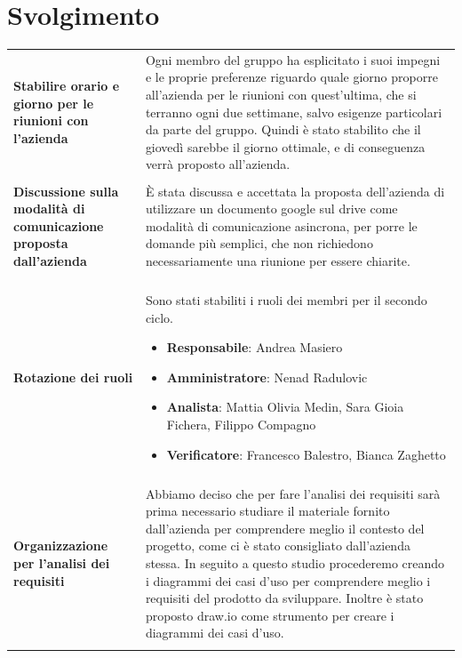 \documentclass[a4paper,12pt]{article}
\begin{document}
    \section{Svolgimento} {
        \begin{longtable}{P{5cm}|P{10cm}} 
            \textbf{Stabilire orario e giorno per le riunioni con l'azienda} & Ogni membro del gruppo ha esplicitato i suoi impegni e le proprie preferenze riguardo quale giorno proporre all'azienda per le riunioni con quest'ultima, che si terranno ogni due settimane, salvo esigenze particolari da parte del gruppo. Quindi è stato stabilito che il giovedì sarebbe il giorno ottimale, e di conseguenza verrà proposto all'azienda. \\\\
            \textbf{Discussione sulla modalità di comunicazione proposta dall'azienda} & È stata discussa e accettata la proposta dell'azienda di utilizzare un documento google sul drive come modalità di comunicazione asincrona, per porre le domande più semplici, che non richiedono necessariamente una riunione per essere chiarite.\\\\
            \textbf{Rotazione dei ruoli} & Sono stati stabiliti i ruoli dei membri per il secondo ciclo.
            \begin{itemize}
                \item \textbf{Responsabile}: Andrea Masiero
                \item \textbf{Amministratore}: Nenad Radulovic
                \item \textbf{Analista}: Mattia Olivia Medin, Sara Gioia Fichera, Filippo Compagno
                \item \textbf{Verificatore}: Francesco Balestro, Bianca Zaghetto
            \end{itemize}\\\\
            \textbf{Organizzazione per l'analisi dei requisiti} & Abbiamo deciso che per fare l'analisi dei requisiti sarà prima necessario studiare il materiale fornito dall'azienda per comprendere meglio il contesto del progetto, come ci è stato consigliato dall'azienda stessa. In seguito a questo studio procederemo creando i diagrammi dei casi d'uso per comprendere meglio i requisiti del prodotto da sviluppare. Inoltre è stato proposto draw.io come strumento per creare i diagrammi dei casi d'uso.\\\\
        \end{longtable}
    }
\end{document}
